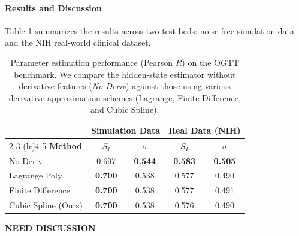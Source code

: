 \paragraph{Results and Discussion}
Table \ref{tab:ogtt_performance} summarizes the results across two test beds: noise-free simulation data and the NIH real-world clinical dataset.

\begin{table}[H]
\centering
\caption{Parameter estimation performance (Pearson $R$) on the OGTT benchmark. 
We compare the hidden-state estimator without derivative features (\textit{No Deriv}) against those using various derivative approximation schemes (Lagrange, Finite Difference, and Cubic Spline).}
\label{tab:ogtt_performance}
\begin{tabular}{@{}lcccc@{}}
\toprule
& \multicolumn{2}{c}{\textbf{Simulation Data}} & \multicolumn{2}{c}{\textbf{Real Data (NIH)}} \\ \cmidrule(lr){2-3} \cmidrule(lr){4-5} 
\textbf{Method} & $S_I$ & $\sigma$ & $S_I$ & $\sigma$ \\ \midrule
No Deriv & 0.697 & \textbf{0.544} & \textbf{0.583} & \textbf{0.505} \\
Lagrange Poly. & \textbf{0.700} & 0.538 & 0.577 & 0.490 \\
Finite Difference & \textbf{0.700} & 0.538 & 0.577 & 0.491 \\
Cubic Spline (Ours) & \textbf{0.700} & 0.538 & 0.576 & 0.490 \\ \bottomrule
\end{tabular}
\end{table}

\textbf{NEED DISCUSSION}